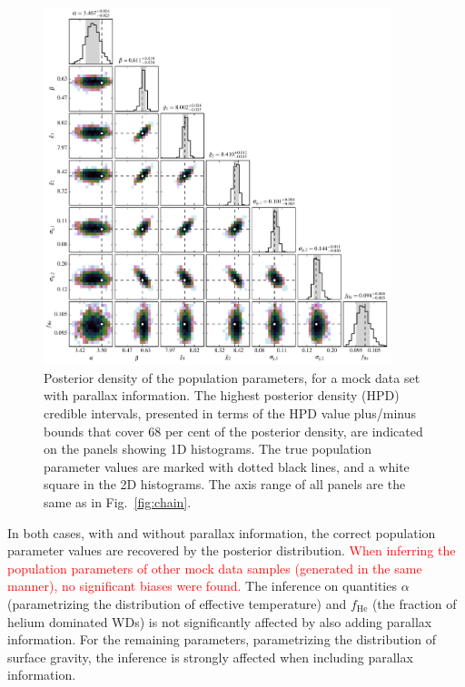 \documentclass[fleqn,usenatbib]{mnras}
\newcommand{\changes}[1]{\textcolor{red}{#1}}
\begin{document}
\begin{figure}
	\includegraphics[width=0.9\textwidth]{toy_chain_include-parallax.pdf}
    \caption{ Posterior density of the population parameters, for a mock data set with parallax information. The highest posterior density (HPD) credible intervals, presented in terms of the HPD value plus/minus bounds that cover 68 per cent of the posterior density, are indicated on the panels showing 1D histograms. The true population parameter values are marked with dotted black lines, and a white square in the 2D histograms. The axis range of all panels are the same as in Fig.~\ref{fig:chain}.}
    \label{fig:chain_parallax}
\end{figure}

In both cases, with and without parallax information, the correct population parameter values are recovered by the posterior distribution. \changes{When inferring the population parameters of other mock data samples (generated in the same manner), no significant biases were found.} The inference on quantities $\alpha$ (parametrizing the distribution of effective temperature) and $f_\text{He}$ (the fraction of helium dominated WDs) is not significantly affected by also adding parallax information. For the remaining parameters, parametrizing the distribution of surface gravity, the inference is strongly affected when including parallax information.
\end{document}
